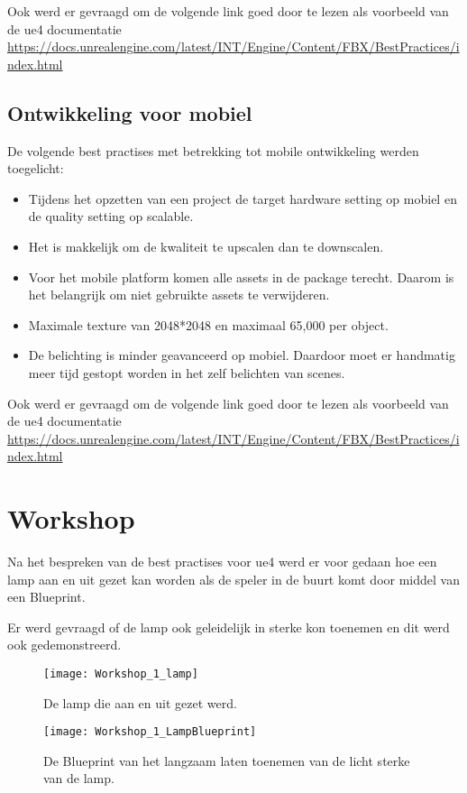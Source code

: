 Ook werd er gevraagd om de volgende link goed door te lezen als voorbeeld van de \gls{ue4} documentatie
\url{https://docs.unrealengine.com/latest/INT/Engine/Content/FBX/BestPractices/index.html}

\subsection{Ontwikkeling voor mobiel}
De volgende best practises met betrekking tot mobile ontwikkeling werden toegelicht:

\begin{itemize}
	\item Tijdens het opzetten van een project de target hardware setting op mobiel en de quality setting op scalable. 
	\item Het is makkelijk om de kwaliteit te upscalen dan te downscalen.
	\item Voor het mobile platform komen alle assets in de package terecht. Daarom is het belangrijk om niet gebruikte assets te verwijderen.
	\item Maximale texture van 2048*2048 en maximaal 65,000 per object.
	\item De belichting is minder geavanceerd op mobiel. Daardoor moet er handmatig meer tijd gestopt worden in het zelf belichten van scenes.
\end{itemize}

Ook werd er gevraagd om de volgende link goed door te lezen als voorbeeld van de \gls{ue4} documentatie
\url{https://docs.unrealengine.com/latest/INT/Engine/Content/FBX/BestPractices/index.html}

\section{Workshop}
Na het bespreken van de best practises voor \gls{ue4} werd er voor gedaan hoe een lamp aan en uit gezet kan worden als de speler in de buurt komt door middel van een Blueprint. 

Er werd gevraagd of de lamp ook geleidelijk in sterke kon toenemen en dit werd ook gedemonstreerd.

\begin{figure}[!ht]
  \centering
    \texttt{[image: Workshop\_1\_lamp]}
    \caption{De lamp die aan en uit gezet werd.}
\end{figure}

\begin{figure}[!ht]
  \centering
    \texttt{[image: Workshop\_1\_LampBlueprint]}
    \caption{De Blueprint van het langzaam laten toenemen van de licht sterke van de lamp.}
\end{figure}